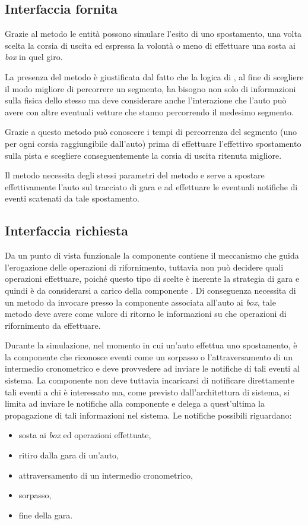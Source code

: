 \subsection*{Interfaccia fornita}
Grazie al metodo  le entità \car{} possono simulare l'esito di uno spostamento, una volta scelta la corsia di uscita ed espressa la volontà o meno di effettuare una sosta ai \textit{box} in quel giro.

La presenza del metodo  è giustificata dal fatto che la logica di , al fine di scegliere il modo migliore di percorrere un segmento, ha bisogno non solo di informazioni sulla fisica dello stesso ma deve considerare anche l'interazione che l'auto può avere con altre eventuali vetture che stanno percorrendo il medesimo segmento.

Grazie a questo metodo  può conoscere i tempi di percorrenza del segmento (uno per ogni corsia raggiungibile dall'auto) prima di effettuare l'effettivo spostamento sulla pista e scegliere conseguentemente la corsia di uscita ritenuta migliore.

Il metodo  necessita degli stessi parametri del metodo  e serve a spostare effettivamente l'auto sul tracciato di gara e ad effettuare le eventuali notifiche di eventi scatenati da tale spostamento.

\subsection*{Interfaccia richiesta}
Da un punto di vista funzionale la componente \track{} contiene il meccanismo che guida l'erogazione delle operazioni di rifornimento, tuttavia non può decidere quali operazioni effettuare, poiché questo tipo di scelte è inerente la strategia di gara e quindi è da considerarsi a carico della componente \team{}. Di conseguenza \track{} necessita di un metodo  da invocare presso la componente \team{} associata all'auto ai \textit{box}, tale metodo deve avere come valore di ritorno le informazioni su che operazioni di rifornimento da effettuare.

Durante la simulazione, nel momento in cui un'auto effettua uno spostamento, è la componente \track{} che riconosce eventi come un sorpasso o l'attraversamento di un intermedio cronometrico e deve provvedere ad inviare le notifiche di tali eventi al sistema. La componente \track{} non deve tuttavia incaricarsi di notificare direttamente tali eventi a chi è interessato ma, come previsto dall'architettura di sistema, si limita ad inviare le notifiche alla componente \evdisp{} e delega a quest'ultima la propagazione di tali informazioni nel sistema.
Le notifiche possibili riguardano:
\begin{itemize}
\item sosta ai \textit{box} ed operazioni effettuate,
\item ritiro dalla gara di un'auto,
\item attraversamento di un intermedio cronometrico,
\item sorpasso,
\item fine della gara.
\end{itemize}

